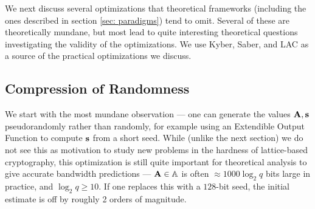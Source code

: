 \label{sec: practical}
We next discuss several optimizations that theoretical frameworks (including the ones described in section \ref{sec: paradigms}) tend to omit.
Several of these are theoretically mundane, but most lead to quite interesting theoretical questions investigating the validity of the optimizations.
We use Kyber, Saber, and LAC as a source of the practical optimizations we discuss.

\subsection{Compression of Randomness}\label{ssec: randomness-compression}
We start with the most mundane observation --- one can generate the values $\mathbf{A}, \mathbf{s}$ pseudorandomly rather than randomly, for example using an Extendible Output Function to compute $\mathbf{s}$ from a short seed.
While (unlike the next section) we do not see this as motivation to study new problems in the hardness of lattice-based cryptography, this optimization is still quite important for theoretical analysis to give accurate bandwidth predictions --- $\mathbf{A}\in \mathbb{A}$ is often $\approx 1000\log_2 q$ bits large in practice, and $\log_2 q \geq 10$.
If one replaces this with a $128$-bit seed, the initial estimate is off by roughly 2 orders of magnitude.

